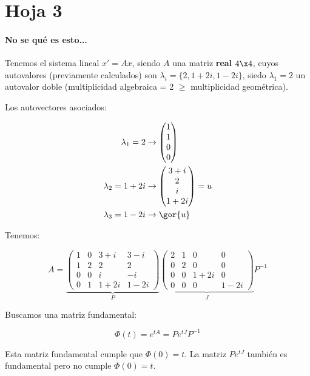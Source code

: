 \documentclass[nochap]{apuntes}
\begin{document}
\section{Hoja 3}


\paragraph{No se qué es esto...}

Tenemos el sistema lineal $x'=Ax$, siendo $A$ una matriz \textbf{real} $4\x4$, cuyos autovalores (previamente calculados) son $\lambda_i = \{2,1+2i,1-2i\}$, siedo $\lambda_1 = 2$ un autovalor doble (multiplicidad algebraica = 2 $\ge$ multiplicidad geométrica).

Los autovectores asociados: 

\begin{align*}
\lambda_1=2 & \to \begin{pmatrix}
1\\1\\0\\0
\end{pmatrix}\\
\lambda_2 = 1+2i & \to \begin{pmatrix}
3+i\\2\\i\\1+2i
\end{pmatrix} = u\\
\lambda_3 = 1-2i & \to \gor{u}\\
\end{align*}

Tenemos:

\[A=\underbrace{\begin{pmatrix}
1&0&3+i&3-i\\
1&2&2&2\\
0&0&i&-i\\
0&1&1+2i&1-2i
\end{pmatrix}}_{P} 
\underbrace{\begin{pmatrix}
2 & 1 & 0 & 0\\
0 & 2 & 0 & 0\\
0 & 0 & 1+2i & 0\\
0 & 0 & 0 & 1-2i
\end{pmatrix}}_{J}P^{-1}\]

Buscamos una matriz fundamental:

\[\Phi(t) = e^{tA} = P e^{tJ}P^{-1}\]

Esta matriz fundamental cumple que $\Phi(0) = t$. La matriz $P e^{tJ}$ también es fundamental pero no cumple $\Phi(0) = t$.
\end{document}
